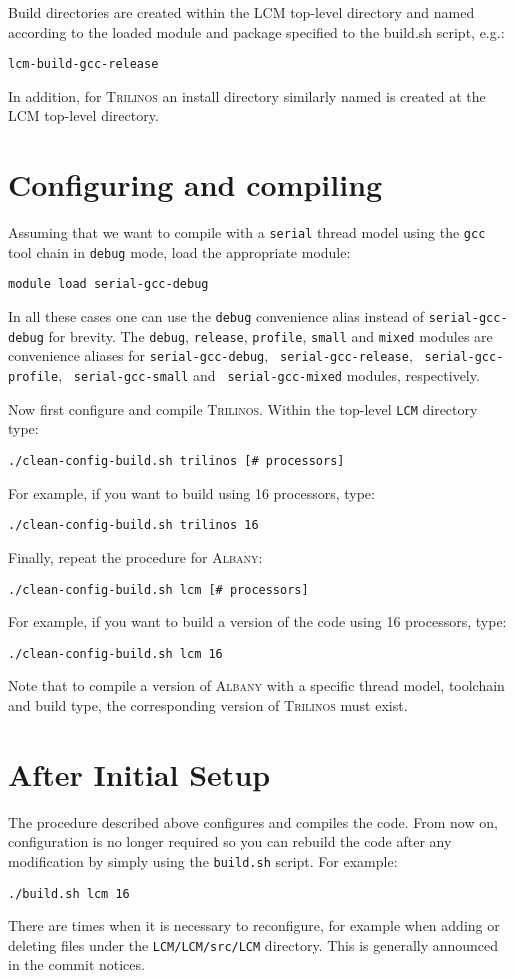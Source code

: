 \documentclass{article}
\newcommand{\trilinos}{\textsc{Trilinos}}
\newcommand{\albany}{\textsc{Albany}}
\newcommand{\lcm}{\textsc{LCM}}
\begin{document}
Build directories are created within the \lcm{} top-level directory
and named according to the loaded module and package specified to the
build.sh script, e.g.:
\begin{verbatim}
lcm-build-gcc-release
\end{verbatim}
In addition, for \trilinos{} an install directory similarly named is
created at the \lcm{} top-level directory.

\section{Configuring and compiling}
\label{sec:config-build}

Assuming that we want to compile with a \verb+serial+ thread model
using the \verb+gcc+ tool chain in \verb+debug+ mode, load the
appropriate module:
\begin{verbatim}
module load serial-gcc-debug
\end{verbatim}

In all these cases one can use the \verb+debug+ convenience alias instead of
\verb+serial-gcc-debug+ for brevity. The \verb+debug+, \verb+release+,
\verb+profile+, \verb+small+ and \verb+mixed+ modules are convenience aliases
for \verb+serial-gcc-debug+, \verb+ serial-gcc-release+,
\verb+ serial-gcc-profile+, \verb+ serial-gcc-small+ and
\verb+ serial-gcc-mixed+ modules, respectively.

Now first configure and compile \trilinos{}. Within the top-level
\verb+LCM+ directory type:
\begin{verbatim}
./clean-config-build.sh trilinos [# processors]
\end{verbatim}
For example, if you want to build using 16 processors, type:
\begin{verbatim}
./clean-config-build.sh trilinos 16
\end{verbatim}
Finally, repeat the procedure for \albany{}:
\begin{verbatim}
./clean-config-build.sh lcm [# processors]
\end{verbatim}
For example, if you want to build a version of the code using 16
processors, type:
\begin{verbatim}
./clean-config-build.sh lcm 16
\end{verbatim}

Note that to compile a version of \albany{} with a specific thread model,
toolchain and build type, the corresponding version of \trilinos{} must
exist.

\section{After Initial Setup}
The procedure described above configures and compiles the code. From
now on, configuration is no longer required so you can rebuild the
code after any modification by simply using the \verb+build.sh+
script. For example:
\begin{verbatim}
./build.sh lcm 16
\end{verbatim}
There are times when it is necessary to reconfigure, for example when
adding or deleting files under the \verb+LCM/LCM/src/LCM+
directory. This is generally announced in the commit notices.
\end{document}
